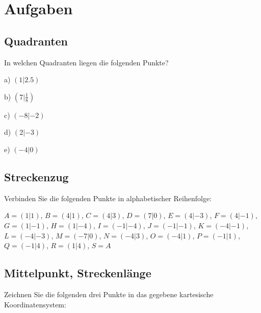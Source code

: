 



\usepackage{amssymb} %
\renewcommand{\metaHeaderLine}{Koordinatensystem}
\renewcommand{\arbeitsblattTitel}{\metaHeaderLine{} Arbeitsblatt (V 1.0)}

\arbeitsblattHeader{}

\section{Aufgaben}

\subsection{Quadranten}
In welchen Quadranten liegen die folgenden Punkte?

a) $(1|2.5)$  

b) $\left(7|\frac18\right)$  

c) $\left(-8|-2\right)$  

d) $\left(2|-3\right)$  

e) $\left(-4|0\right)$  

\newpage
\subsection{Streckenzug}
Verbinden Sie die folgenden Punkte in alphabetischer Reihenfolge:

$A=( 1| 1)$, $B=( 4| 1)$, $C=( 4| 3)$, $D=( 7| 0)$, 
$E=( 4|-3)$, $F=( 4|-1)$, $G=( 1|-1)$, $H=( 1|-4)$, 
$I=(-1|-4)$, $J=(-1|-1)$, $K=(-4|-1)$, $L=(-4|-3)$, 
$M=(-7| 0)$, $N=(-4| 3)$, $O=(-4| 1)$, $P=(-1| 1)$, 
$Q=(-1| 4)$, $R=( 1| 4)$, $S=A$

\newpage%
\subsection{Mittelpunkt, Streckenlänge}
Zeichnen Sie die folgenden drei Punkte in das gegebene kartesische
Koordinatensystem:

